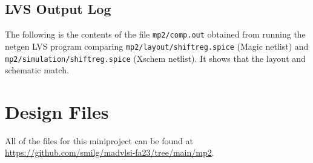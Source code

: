 \documentclass{article}
\begin{document}
\subsection{LVS Output Log}

The following is the contents of the file \texttt{mp2/comp.out} obtained from running the netgen LVS program comparing \texttt{mp2/layout/shiftreg.spice} (Magic netlist) and \texttt{mp2/simulation/shiftreg.spice} (Xschem netlist). It shows that the layout and schematic match.

\lstset{%
    breaklines=true,
    breakatwhitespace=true,
}


\section{Design Files}

All of the files for this miniproject can be found at \url{https://github.com/smilg/madvlsi-fa23/tree/main/mp2}.
\end{document}
